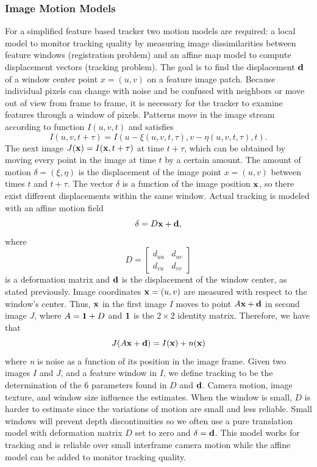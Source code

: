 \documentclass{article}
\begin{document}
\subsubsection{Image Motion Models}
For a simplified feature based tracker two motion models are required: a local model to monitor tracking quality by measuring image dissimilarities between feature windows (registration problem) and an affine map model to compute displacement vectors (tracking problem).  The goal is to find the displacement ${\bf d}$ of a window center point $x = (u,v)$ on a feature image patch.  Because individual pixels can change with noise and be confused with neighbors or move out of view from frame to frame, it is necessary for the tracker to examine features through a window of pixels. Patterns move in the image stream according to function $I(u,v,t)$ and satisfies 
\[
I(u,v,t+\tau) = I(u-\xi(u, v, t, \tau),v-\eta(u, v, t, \tau),t).
\]
The next image $J({\bf x}) = I({\bf x},t+\tau)$ at time $t + \tau$, which can be obtained by moving every point in the image at time $t$ by a certain amount.  The amount of motion ${\delta} = (\xi, \eta)$ is the displacement of the image point $x = (u,v)$ between times $t$ and $t + \tau$.  The vector ${\delta}$ is a function of the image position ${\bf x}$, so there exist different displacements within the same window.  Actual tracking is modeled with an affine motion field
\[
\delta = D{\bf x} + {\bf d},
\] 
where
\[
D =
\begin{bmatrix}
  d_{uu} & d_{uv} \\
  d_{vu} & d_{vv} 
\end{bmatrix}
\]
is a deformation matrix and ${\bf d}$ is the displacement of the window center, as stated previously.   Image coordinates ${\bf x} = (u,v)$ are measured with respect to the window's center.  Thus, ${\bf x}$ in the first image $I$ moves to point $A{\bf x}+{\bf d}$ in second image $J$, where $A = {\bf 1}+D$ and ${\bf 1}$ is the $2\times 2$ identity matrix.     Therefore, we have that
\[
J(A{\bf x + d}) = I({\bf x }) + n({\bf x})
\]
where {\em n} is noise as a function of its position in the image frame.  Given two images $I$ and $J$, and a feature window in $I$, we define tracking to be the determination of the 6 parameters found in $D$ and ${\bf d}$. Camera motion, image texture, and window size influence the estimates.  When the window is small, $D$ is harder to estimate since the variations of motion are small and less reliable.  Small windows will prevent depth discontinuities so we often use a pure translation model with deformation matrix $D$ set to zero and $\delta = {\bf d}$.  This model works for tracking and is reliable over small interframe camera motion while the affine model can be added to monitor tracking quality. 
\end{document}
